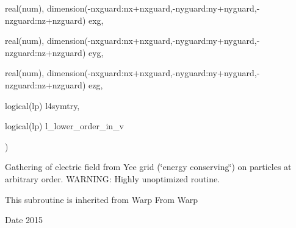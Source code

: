 {\begin{DoxyParamCaption}
\item[{real(num), dimension(-\/nxguard\+:nx+nxguard,-\/nyguard\+:ny+nyguard,-\/nzguard\+:nz+nzguard)}]{exg, }
\item[{real(num), dimension(-\/nxguard\+:nx+nxguard,-\/nyguard\+:ny+nyguard,-\/nzguard\+:nz+nzguard)}]{eyg, }
\item[{real(num), dimension(-\/nxguard\+:nx+nxguard,-\/nyguard\+:ny+nyguard,-\/nzguard\+:nz+nzguard)}]{ezg, }
\item[{logical(lp)}]{l4symtry, }
\item[{logical(lp)}]{l\+\_\+lower\+\_\+order\+\_\+in\+\_\+v}
\end{DoxyParamCaption}
)}\hypertarget{field__gathering_8_f90_af8a29b924d0086de0d933851a07b5f32}{}\label{field__gathering_8_f90_af8a29b924d0086de0d933851a07b5f32}


Gathering of electric field from Yee grid (\char`\"{}energy conserving\char`\"{}) on particles at arbitrary order. W\+A\+R\+N\+I\+NG\+: Highly unoptimized routine. 

This subroutine is inherited from Warp  From Warp \begin{DoxyDate}{Date}
2015 
\end{DoxyDate}
